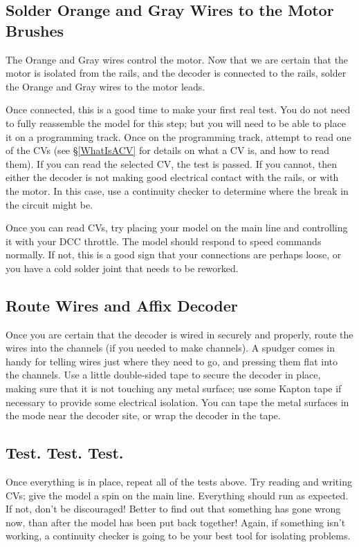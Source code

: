 \documentclass[12pt,letterpaper,draft]{memoir} %
\begin{document}
\subsection{Solder Orange and Gray Wires to the Motor Brushes}

The Orange and Gray wires control the motor. Now that we are certain that the motor is isolated from the rails, and the decoder is connected to the rails, solder the Orange and Gray wires to the motor leads.

Once connected, this is a good time to make your first real test. You do not need to fully reassemble the model for this step; but you will need to be able to place it on a programming track. Once on the programming track, attempt to read one of the CVs (see \S\ref{WhatIsACV} for details on what a CV is, and how to read them). If you can read the selected CV, the test is passed. If you cannot, then either the decoder is not making good electrical contact with the rails, or with the motor. In this case, use a continuity checker to determine where the break in the circuit might be.

Once you can read CVs, try placing your model on the main line and controlling it with your DCC throttle. The model should respond to speed commands normally. If not, this is a good sign that your connections are perhaps loose, or you have a cold solder joint that needs to be reworked.

\subsection{Route Wires and Affix Decoder}

Once you are certain that the decoder is wired in securely and properly, route the wires into the channels (if you needed to make channels). A spudger comes in handy for telling wires just where they need to go, and pressing them flat into the channels. Use a little double-sided tape to secure the decoder in place, making sure that it is not touching any metal surface; use some Kapton tape if necessary to provide some electrical isolation. You can tape the metal surfaces in the mode near the decoder site, or wrap the decoder in the tape.

\subsection {Test. Test. Test.}

Once everything is in place, repeat all of the tests above. Try reading and writing CVs; give the model a spin on the main line. Everything should run as expected. If not, don't be discouraged! Better to find out that something has gone wrong now, than after the model has been put back together! Again, if something isn't working, a continuity checker is going to be your best tool for isolating problems.
\end{document}
